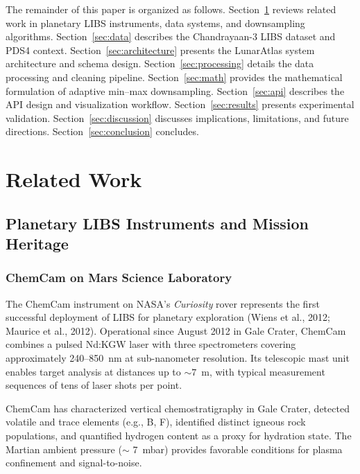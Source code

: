 \documentclass[12pt,a4paper]{article}
\begin{document}
The remainder of this paper is organized as follows. Section~\ref{sec:related} reviews related work in planetary LIBS instruments, data systems, and downsampling algorithms. Section~\ref{sec:data} describes the Chandrayaan-3 LIBS dataset and PDS4 context. Section~\ref{sec:architecture} presents the LunarAtlas system architecture and schema design. Section~\ref{sec:processing} details the data processing and cleaning pipeline. Section~\ref{sec:math} provides the mathematical formulation of adaptive min--max downsampling. Section~\ref{sec:api} describes the API design and visualization workflow. Section~\ref{sec:results} presents experimental validation. Section~\ref{sec:discussion} discusses implications, limitations, and future directions. Section~\ref{sec:conclusion} concludes.

\section{Related Work}
\label{sec:related}

\subsection{Planetary LIBS Instruments and Mission Heritage}

\subsubsection{ChemCam on Mars Science Laboratory}

The ChemCam instrument on NASA's \emph{Curiosity} rover represents the first successful deployment of LIBS for planetary exploration (Wiens et al., 2012; Maurice et al., 2012). Operational since August 2012 in Gale Crater, ChemCam combines a pulsed Nd:KGW laser with three spectrometers covering approximately 240--850~nm at sub-nanometer resolution. Its telescopic mast unit enables target analysis at distances up to \(\sim 7\)~m, with typical measurement sequences of tens of laser shots per point.

ChemCam has characterized vertical chemostratigraphy in Gale Crater, detected volatile and trace elements (e.g., B, F), identified distinct igneous rock populations, and quantified hydrogen content as a proxy for hydration state. The Martian ambient pressure (\(\sim\) 7~mbar) provides favorable conditions for plasma confinement and signal-to-noise.
\end{document}
